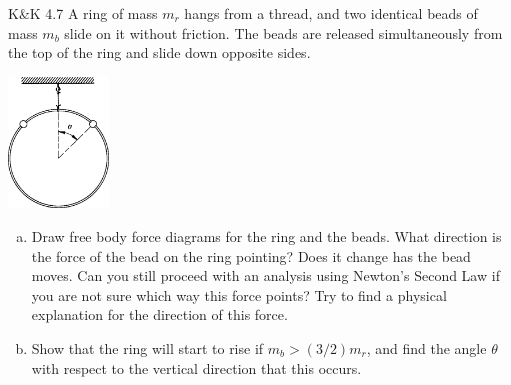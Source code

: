 \documentclass{esg8012pset}
\begin{document}
\begin{problem}{K\&K 4.7}
  A ring of mass $m_r$ hangs from a thread, and two identical beads of mass $m_b$ slide on it without friction. The beads are released simultaneously from the top of the ring and slide down opposite sides.
  \begin{center}\includegraphics[width=0.2\textwidth]{ps06_2}\end{center}
  \begin{enumerate}[(a)]
  \item Draw free body force diagrams for the ring and the beads. What direction is the force of the bead on the ring pointing? Does it change has the bead moves. Can you still proceed with an analysis using Newton's Second Law if you are not sure which way this force points? Try to find a physical explanation for the direction of this force.
    \item Show that the ring will start to rise if $m_b > (3/2)m_r$, and find the angle $\theta$ with respect to the vertical direction that this occurs.
  \end{enumerate}
\end{problem}
\end{document}

